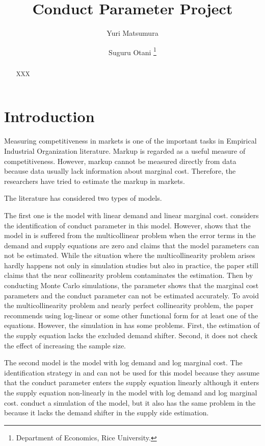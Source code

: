 \documentclass[11pt, a4paper]{article}
\title{Conduct Parameter Project}
\author{Yuri Matsumura \and Suguru Otani \footnote{Department of Economics, Rice University.}}
\begin{document}
\maketitle

\begin{abstract}
    XXX
\end{abstract}

\section{Introduction}
Measuring competitiveness in markets is one of the important tasks in Empirical Industrial Organization literature.
Markup is regarded as a useful measure of competitiveness. 
However, markup cannot be measured directly from data because data usually lack information about marginal cost.
Therefore, the researchers have tried to estimate the markup in markets.



The literature has considered two types of models.

The first one is the model with linear demand and linear marginal cost.
\citet{bresnahan1982oligopoly} considers the identification of conduct parameter in this model.
However, \citet{perloff2012collinearity} shows that the model in \citet{bresnahan1982oligopoly} is suffered from the multicollinear problem when the error terms in the demand and supply equations are zero and claims that the model parameters can not be estimated.
While the situation where the multicollinearity problem arises hardly happens not only in simulation studies but also in practice, the paper still claims that the near collinearity problem contaminates the estimation.
Then by conducting Monte Carlo simulations, the parameter shows that the marginal cost parameters and the conduct parameter can not be estimated accurately.
To avoid the multicollinearity problem and nearly perfect collinearity problem, the paper recommends using log-linear or some other functional form for at least one of the equations.
However, the simulation in \cite{perloff2012collinearity} has some problems.
First, the estimation of the supply equation lacks the excluded demand shifter.
Second, it does not check the effect of increasing the sample size.


The second model is the model with log demand and log marginal cost.
The identification strategy in \cite{bresnahan1982oligopoly} and \cite{lau1982identifying} can not be used for this model because they assume that the conduct parameter enters the supply equation linearly although it enters the supply equation non-linearly in the model with log demand and log marginal cost.
\cite{hyde1995can} conduct a simulation of the model, but it also has the same problem in the \cite{perloff2012collinearity} because it lacks the demand shifter in the supply side estimation.
\end{document}

